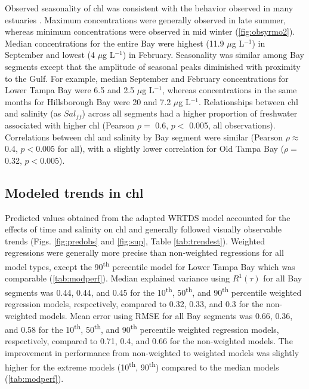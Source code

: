 \documentclass{svjour3}\usepackage[]{graphicx}\usepackage[]{color}
\newcommand{\mugl}{$\mu$g L$^{-1}$}
\newcommand{\nine}{90\textsuperscript{th} percentile }
\begin{document}
Observed seasonality of \ac{chl} was consistent with the behavior observed in many estuaries \cite{Winder10}.  Maximum concentrations were generally observed in late summer, whereas minimum concentrations were observed in mid winter (\cref{fig:obsyrmo2}).  Median concentrations for the entire Bay were highest (11.9 \mugl) in September and lowest (4 \mugl) in February.  Seasonality was similar among Bay segments except that the amplitude of seasonal peaks diminished with proximity to the Gulf.  For example, median September and February concentrations for Lower Tampa Bay were 6.5 and 2.5 \mugl, whereas concentrations in the same months for Hillsborough Bay were 20 and 7.2 \mugl.  Relationships between \ac{chl} and salinity (as $Sal_{ff}$) across all segments had a higher proportion of freshwater associated with higher \ac{chl} (Pearson $\rho=$ 0.6, $p<$ 0.005, all observations).  Correlations between \ac{chl} and salinity by Bay segment were similar (Pearson $\rho \approx$ 0.4, $p<0.005$ for all), with a slightly lower correlation for Old Tampa Bay ($\rho=$ 0.32, $p<0.005$).

\subsection{Modeled trends in \acl{chl}}

Predicted values obtained from the adapted \ac{WRTDS} model accounted for the effects of time and salinity on \ac{chl} and generally followed visually observable trends (Figs. \ref{fig:predobs} and \ref{fig:sup}, Table \ref{tab:trendest}).  Weighted regressions were generally more precise than non-weighted regressions for all model types, except the \nine model for Lower Tampa Bay which was comparable (\cref{tab:modperf}). Median explained variance using $R^1\left(\tau\right)$ for all Bay segments was 0.44, 0.44, and 0.45 for the 10\textsuperscript{th}, 50\textsuperscript{th}, and 90\textsuperscript{th} percentile weighted regression models, respectively, compared to 0.32, 0.33, and 0.3 for the non-weighted models.  Mean error using \ac{RMSE} for all Bay segments was 0.66, 0.36, and 0.58 for the 10\textsuperscript{th}, 50\textsuperscript{th}, and 90\textsuperscript{th} percentile weighted regression models, respectively, compared to 0.71, 0.4, and 0.66 for the non-weighted models.  The improvement in performance from non-weighted to weighted models was slightly higher for the extreme models (10\textsuperscript{th}, 90\textsuperscript{th}) compared to the median models (\cref{tab:modperf}).    
\end{document}
